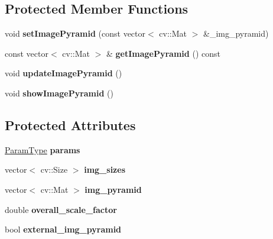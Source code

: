 \subsection*{Protected Member Functions}
\begin{DoxyCompactItemize}
\item 
\hypertarget{classPyramidalSM_a246bfb9175ef38390cf783f1fb52124b}{void {\bfseries set\-Image\-Pyramid} (const vector$<$ cv\-::\-Mat $>$ \&\-\_\-img\-\_\-pyramid)}\label{classPyramidalSM_a246bfb9175ef38390cf783f1fb52124b}

\item 
\hypertarget{classPyramidalSM_a71a6ee88b9f9dee753104d8c3ba31ea4}{const vector$<$ cv\-::\-Mat $>$ \& {\bfseries get\-Image\-Pyramid} () const }\label{classPyramidalSM_a71a6ee88b9f9dee753104d8c3ba31ea4}

\item 
\hypertarget{classPyramidalSM_a056a5a56bb2f953b7b8ae28db1d53b62}{void {\bfseries update\-Image\-Pyramid} ()}\label{classPyramidalSM_a056a5a56bb2f953b7b8ae28db1d53b62}

\item 
\hypertarget{classPyramidalSM_aed24549049cc94737d20a0c069f19f36}{void {\bfseries show\-Image\-Pyramid} ()}\label{classPyramidalSM_aed24549049cc94737d20a0c069f19f36}

\end{DoxyCompactItemize}
\subsection*{Protected Attributes}
\begin{DoxyCompactItemize}
\item 
\hypertarget{classPyramidalSM_a014596eda4a45a8a3e1aeaf6ac81bf1f}{\hyperlink{structPyramidalParams}{Param\-Type} {\bfseries params}}\label{classPyramidalSM_a014596eda4a45a8a3e1aeaf6ac81bf1f}

\item 
\hypertarget{classPyramidalSM_ac5904d3620e68a6bcae01befa71e528f}{vector$<$ cv\-::\-Size $>$ {\bfseries img\-\_\-sizes}}\label{classPyramidalSM_ac5904d3620e68a6bcae01befa71e528f}

\item 
\hypertarget{classPyramidalSM_abda0f6c5cdb52c6f4e9337b2a69650e9}{vector$<$ cv\-::\-Mat $>$ {\bfseries img\-\_\-pyramid}}\label{classPyramidalSM_abda0f6c5cdb52c6f4e9337b2a69650e9}

\item 
\hypertarget{classPyramidalSM_afd0acbd04d7e9347ae01df412b9d4530}{double {\bfseries overall\-\_\-scale\-\_\-factor}}\label{classPyramidalSM_afd0acbd04d7e9347ae01df412b9d4530}

\item 
\hypertarget{classPyramidalSM_a6b6ee0405b08e71a3515e16f14c9c970}{bool {\bfseries external\-\_\-img\-\_\-pyramid}}\label{classPyramidalSM_a6b6ee0405b08e71a3515e16f14c9c970}

\end{DoxyCompactItemize}


